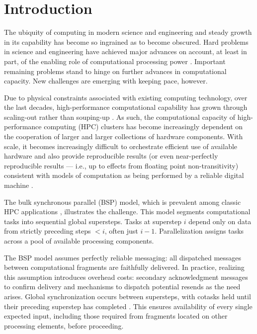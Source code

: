 

\section{Introduction}
\label{sec:introoduction;ch:conduit}

The ubiquity of computing in modern science and engineering and steady growth in its capability has become so ingrained as to become obscured.
Hard problems in science and engineering have achieved major advances on account, at least in part, of the enabling role of computational processing power \citep{gagliardi2019international}.
Important remaining problems stand to hinge on further advances in computational capacity.
New challenges are emerging with keeping pace, however.

Due to physical constraints associated with existing computing technology, over the last decades, high-performance computational capability has grown through scaling-out rather than souping-up \citep{sutter2005free}.
As such, the computational capacity of high-performance computing (HPC) clusters has become increasingly dependent on the cooperation of larger and larger collections of hardware components.
With scale, it becomes increasingly difficult to orchestrate efficient use of available hardware and also provide reproducible results (or even near-perfectly reproducible results --- i.e., up to effects from floating point non-transitivity) consistent with models of computation as being performed by a reliable digital machine \citep{heroux2014toward}.


The bulk synchronous parallel (BSP) model, which is prevalent among classic HPC applications \citep{dongarra2014applied}, illustrates the challenge.
This model segments computational tasks into sequential global supersteps.
Tasks at superstep $i$ depend only on data from strictly preceding steps $<i$, often just $i-1$.
Parallelization assigns tasks across a pool of available processing components.

The BSP model assumes perfectly reliable messaging: all dispatched messages between computational fragments are faithfully delivered.
In practice, realizing this assumption introduces overhead costs: secondary acknowledgment messages to confirm delivery and mechanisms to dispatch potential resends as the need arises.
Global synchronization occurs between supersteps, with cotasks held until their preceding superstep has completed \citep{valiant1990bridging}.
This ensures availability of every single expected input, including those required from fragments located on other processing elements, before proceeding.

